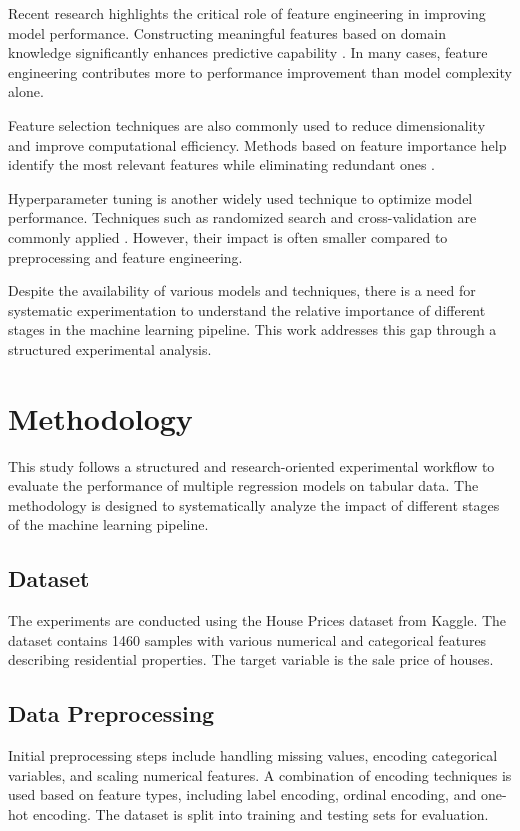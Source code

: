 \documentclass[conference]{IEEEtran}
\begin{document}
Recent research highlights the critical role of feature engineering in improving model performance. Constructing meaningful features based on domain knowledge significantly enhances predictive capability \cite{domingos2012few}. In many cases, feature engineering contributes more to performance improvement than model complexity alone.

Feature selection techniques are also commonly used to reduce dimensionality and improve computational efficiency. Methods based on feature importance help identify the most relevant features while eliminating redundant ones \cite{guyon2003introduction}.

Hyperparameter tuning is another widely used technique to optimize model performance. Techniques such as randomized search and cross-validation are commonly applied \cite{bergstra2012random}. However, their impact is often smaller compared to preprocessing and feature engineering.

Despite the availability of various models and techniques, there is a need for systematic experimentation to understand the relative importance of different stages in the machine learning pipeline. This work addresses this gap through a structured experimental analysis.

\section{Methodology}

This study follows a structured and research-oriented experimental workflow to evaluate the performance of multiple regression models on tabular data. The methodology is designed to systematically analyze the impact of different stages of the machine learning pipeline.

\subsection{Dataset}

The experiments are conducted using the House Prices dataset from Kaggle. The dataset contains 1460 samples with various numerical and categorical features describing residential properties. The target variable is the sale price of houses.

\subsection{Data Preprocessing}

Initial preprocessing steps include handling missing values, encoding categorical variables, and scaling numerical features. A combination of encoding techniques is used based on feature types, including label encoding, ordinal encoding, and one-hot encoding. The dataset is split into training and testing sets for evaluation.
\end{document}
